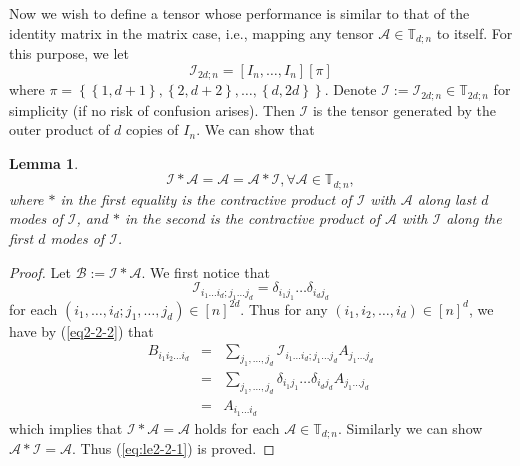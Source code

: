 \documentclass[11pt, oneside]{article}  %
\newtheorem{lem}[thm]{Lemma}
\newcommand{\set}[1]{\left\{#1\right\}}
\newcommand{\TT}{\mathbb{T}}
\newcommand{\A}{\mathcal{A}}
\newcommand{\B}{\mathcal{B}}
\newcommand{\caI}{\mathcal{I}}
\newcommand{\beq}{\begin{equation}}
\newcommand{\eeq}{\end{equation}}
\newcommand{\beyy}{\begin{eqnarray*}}
\newcommand{\eeyy}{\end{eqnarray*}}
\begin{document}
Now we wish to define a tensor whose performance is similar to that of the identity matrix in the matrix case, i.e., mapping any tensor 
$\A\in\TT_{d;n}$ to itself.  For this purpose, we let 
\beq\label{eq:iden}  
\caI_{2d;n} = [I_{n}, \ldots, I_{n}][\pi]
\eeq
where $\pi=\set{\set{1,d+1},\set{2,d+2}, \ldots, \set{d, 2d}}$.  Denote $\caI:=\caI_{2d;n}\in\TT_{2d;n}$ for simplicity (if no risk of confusion arises). 
Then $\caI$ is the tensor generated by the outer product of  $d$ copies of $I_{n}$. We can show that 
\begin{lem}\label{le2-2}
\beq\label{eq:le2-2-1} 
\caI\ast \A = \A = \A\ast \caI, \forall  \A\in\TT_{d;n},
\eeq
where $\ast$ in the first equality is the contractive product of $\caI$ with $\A$ along last $d$ modes of $\caI$, and $\ast$ in the second is the 
contractive product of $\A$ with $\caI$ along the first $d$ modes of $\caI$. 
\end{lem}
\begin{proof}
Let $\B:=\caI\ast \A$.  We first notice that 
\beq\label{eq2-2-2}
\caI_{i_{1}\ldots i_{d};j_{1}\ldots j_{d}} = \delta_{i_{1}j_{1}}\ldots \delta_{i_{d}j_{d}} 
\eeq
for each $(i_{1},\ldots,i_{d};j_{1},\ldots, j_{d})\in [n]^{2d}$.  Thus for any $(i_{1},i_{2},\ldots,i_{d})\in [n]^{d}$, we have by (\ref{eq2-2-2}) that 
\beyy\label{eq2-2-3}
B_{i_{1}i_{2}\ldots i_{d}}
&=& \sum_{j_{1},\ldots, j_{d}} \caI_{i_{1}\ldots i_{d};j_{1}\ldots j_{d}} A_{j_{1}\ldots j_{d}}\\ 
&=&\sum_{j_{1},\ldots, j_{d}}\delta_{i_{1}j_{1}}\ldots \delta_{i_{d}j_{d}} A_{j_{1}\ldots j_{d}}\\
&=& A_{i_{1}\ldots i_{d}}
\eeyy
which implies that $\caI\ast \A = \A$ holds  for each $\A\in\TT_{d;n}$. Similarly we can show $\A\ast \caI = \A$.  Thus (\ref{eq:le2-2-1}) is proved. 
\end{proof}
 
\end{document}
